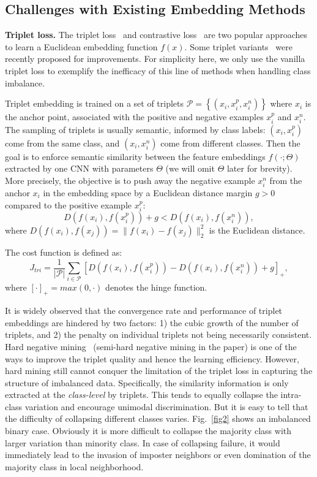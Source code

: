 \documentclass[10pt,journal,compsoc]{IEEEtran}
\begin{document}
\subsection{Challenges with Existing Embedding Methods}

\noindent
{\bf Triplet loss.} The triplet loss~\cite{Schroff15} and contrastive loss~\cite{Yi14} are two popular approaches to learn a Euclidean embedding function $f(x)$. Some triplet variants~\cite{NIPS6200,NIPS6368} were recently proposed for improvements. For simplicity here, we only use the vanilla triplet loss to exemplify the inefficacy of this line of methods when handling class imbalance.

Triplet embedding is trained on a set of triplets $\mathcal{P}=\left\{ (x_i,x_i^p,x_i^n) \right\}$ where $x_i$ is the anchor point, associated with the positive and negative examples $x_i^p$ and $x_i^n$. The sampling of triplets is usually semantic, informed by class labels: $(x_i,x_i^p)$ come from the same class, and $(x_i,x_i^n)$ come from different classes. Then the goal is to enforce semantic similarity between the feature embeddings $f(\cdot;\Theta)$ extracted by one CNN with parameters $\Theta$ (we will omit $\Theta$ later for brevity). More precisely, the objective is to push away the negative example $x_i^n$ from the anchor $x_i$ in the embedding space by a Euclidean distance margin $g>0$ compared to the positive example $x_i^p$:
\begin{equation}
\label{eq1}
D(f(x_i),f(x_i^p))+g<D(f(x_i),f(x_i^n)),
\end{equation}
where $D(f(x_i),f(x_j))=\|f(x_i)-f(x_j)\|_2^2$ is the Euclidean distance.

The cost function is defined as:
\begin{equation}
\label{eq2}
J_{tri} = \frac{1}{|\mathcal{P}|} \sum_{i\in \mathcal{P}} \left[ D(f(x_i),f(x_i^p)) - D(f(x_i),f(x_i^n))+g \right]_+,
\end{equation}
where $[\cdot]_+=max(0,\cdot)$ denotes the hinge function.

It is widely observed that the convergence rate and performance of triplet embeddings are hindered by two factors: 1) the cubic growth of the number of triplets, and 2) the penalty on individual triplets not being necessarily consistent. Hard negative mining~\cite{Schroff15} (semi-hard negative mining in the paper) is one of the ways to improve the triplet quality and hence the learning efficiency. However, hard mining still cannot conquer the limitation of the triplet loss in capturing the structure of imbalanced data. Specifically, the similarity information is only extracted at the \textit{class-level} by triplets. This tends to equally collapse the intra-class variation and encourage unimodal discrimination. But it is easy to tell that the difficulty of collapsing different classes varies. Fig.~\ref{fig2} shows an imbalanced binary case. Obviously it is more difficult to collapse the majority class with larger variation than minority class. In case of collapsing failure, it would immediately lead to the invasion of imposter neighbors or even domination of the majority class in local neighborhood.
\end{document}
